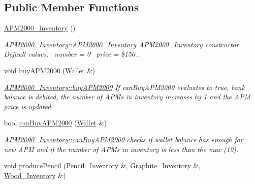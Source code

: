 \subsection*{Public Member Functions}
\begin{DoxyCompactItemize}
\item 
\hyperlink{classAPM2000__Inventory_a0aa6a0abe496ccd0ee773c4a3ce38a2c}{A\+P\+M2000\+\_\+\+Inventory} ()
\begin{DoxyCompactList}\small\item\em \hyperlink{classAPM2000__Inventory_a0aa6a0abe496ccd0ee773c4a3ce38a2c}{A\+P\+M2000\+\_\+\+Inventory\+::\+A\+P\+M2000\+\_\+\+Inventory} \hyperlink{classAPM2000__Inventory}{A\+P\+M2000\+\_\+\+Inventory} constructor.~\newline
Default values\+:~\newline
number = 0~\newline
price = \$150.. \end{DoxyCompactList}\item 
void \hyperlink{classAPM2000__Inventory_a5f89890fced248efa0792e0ac062e9e2}{buy\+A\+P\+M2000} (\hyperlink{classWallet}{Wallet} \&)
\begin{DoxyCompactList}\small\item\em \hyperlink{classAPM2000__Inventory_a5f89890fced248efa0792e0ac062e9e2}{A\+P\+M2000\+\_\+\+Inventory\+::buy\+A\+P\+M2000} If can\+Buy\+A\+P\+M2000 evaluates to true, bank balance is debited, the number of A\+P\+Ms in inventory increases by 1 and the A\+PM price is updated. \end{DoxyCompactList}\item 
bool \hyperlink{classAPM2000__Inventory_a8edb69c3a8614e7b709605f59a3c409b}{can\+Buy\+A\+P\+M2000} (\hyperlink{classWallet}{Wallet} \&)
\begin{DoxyCompactList}\small\item\em \hyperlink{classAPM2000__Inventory_a8edb69c3a8614e7b709605f59a3c409b}{A\+P\+M2000\+\_\+\+Inventory\+::can\+Buy\+A\+P\+M2000} checks if wallet balance has enough for new A\+PM and if the number of A\+P\+Ms in inventory is less than the max (10). \end{DoxyCompactList}\item 
void \hyperlink{classAPM2000__Inventory_ad7ffc7e7536509d26d76800b2398bfc0}{produce\+Pencil} (\hyperlink{classPencil__Inventory}{Pencil\+\_\+\+Inventory} \&, \hyperlink{classGraphite__Inventory}{Graphite\+\_\+\+Inventory} \&, \hyperlink{classWood__Inventory}{Wood\+\_\+\+Inventory} \&)
\item 

\end{DoxyCompactItemize}
